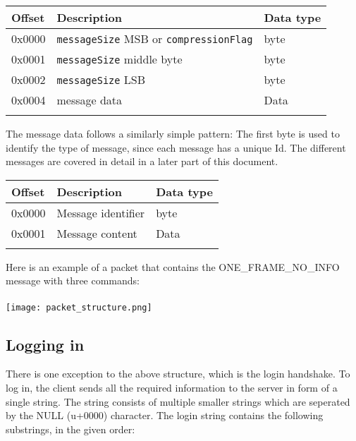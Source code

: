 \documentclass{article}
\newcommand{\field}[1]{\textcolor{fieldColor}{\texttt{#1}}}
\newenvironment{bytelisting}
{\ttfamily \begin{center} \begin{tabular}{l l l} Offset & Description & Data type \\ \hline}
{\normalfont \end{tabular} \end{center}}
\begin{document}
\begin{bytelisting}
0x0000 & \field{messageSize} MSB or \field{compressionFlag} & byte \\
0x0001 & \field{messageSize} middle byte & byte\\
0x0002 & \field{messageSize} LSB & byte\\
0x0004 & message data & Data\\
\end{bytelisting}

The message data follows a similarly simple pattern: The first byte is used to identify the type of message, since each message has a unique Id.
The different messages are covered in detail in a later part of this document.

\begin{bytelisting}
0x0000 & Message identifier & byte \\
0x0001 & Message content & Data\\
\end{bytelisting}

Here is an example of a packet that contains the ONE\_FRAME\_NO\_INFO message with three commands:\\
\\
\texttt{[image: packet\_structure.png]}

\subsection{Logging in}
There is one exception to the above structure, which is the login handshake. To log in, the client sends all the required information to the server in form of a single string.
The string consists of multiple smaller strings which are seperated by the NULL (u+0000) character. The login string contains the following substrings, in the given order:
\end{document}
